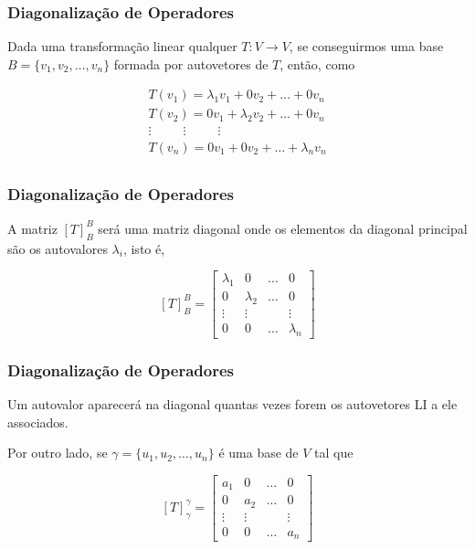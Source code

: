 \documentclass[hyperref={pdfpagelabels=false}]{beamer}
\begin{document}
\begin{frame}
\frametitle{Diagonalização de Operadores}

Dada uma transformação linear qualquer $T:V \rightarrow V$, se conseguirmos uma base $B=\{ v_1, v_2, \dots, v_n \}$ formada por autovetores de $T$, então, como

\begin{eqnarray*}
	T(v_1) = \lambda_1 v_1 + 0v_2 + \dots + 0v_n \\
	T(v_2) = 0v_1 + \lambda_2 v_2 + \dots + 0v_n \\
	\vdots \hspace{30pt} \vdots \hspace{30pt} \vdots \hspace{40pt} \\
	T(v_n) = 0v_1 + 0v_2 + \dots + \lambda_n v_n \\
\end{eqnarray*}



\end{frame}



\begin{frame}
\frametitle{Diagonalização de Operadores}

A matriz $[T]_{B}^{B}$ será uma matriz diagonal onde os elementos da diagonal principal são os autovalores $\lambda _i$, isto é, 

$$[T]_{B}^{B} = \left[
\begin{array}{cccc}
\lambda_1	&	0		&	\dots	&	0\\
0		&	\lambda_2	&	\dots	&	0 \\
\vdots	&	\vdots	&			&	\vdots	\\
0		&	0		&	\dots	&	\lambda_n
\end{array}
\right]$$

\end{frame}



\begin{frame}
\frametitle{Diagonalização de Operadores}

Um autovalor aparecerá na diagonal quantas vezes forem os autovetores LI a ele associados.

Por outro lado, se $\gamma = \{ u_1, u_2, \dots, u_n  \}$ é uma base de $V$ tal que

$$[T]_{\gamma}^{\gamma} = \left[
\begin{array}{cccc}
a_1	&	0		&	\dots	&	0\\
0		&	a_2	&	\dots	&	0 \\
\vdots	&	\vdots	&			&	\vdots	\\
0		&	0		&	\dots	&	a_n
\end{array}
\right]$$

\end{frame}
\end{document}
